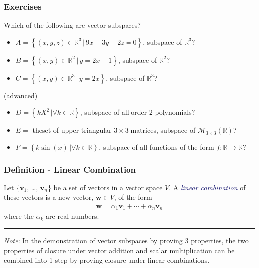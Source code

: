 \documentclass[usenames,dvipsnames,aspectratio=169,10pt]{beamer}
\numberwithin{equation}{section}
\begin{document}
\begin{frame}
\frametitle{Exercises}
Which of the following are vector subspaces?
\begin{itemize}
\item $A= \left\{ (x,y,z)\in\mathbb{R}^3 \, | \, 9x - 3y + 2z = 0 \right\}$, subspace of $\mathbb{R}^3$?
\item $B= \left\{ (x,y)\in\mathbb{R}^2 \, | \, y = 2x + 1 \right\}$, subspace of $\mathbb{R}^2$?
\item $C= \left\{ (x,y)\in\mathbb{R}^3 \, | \, y = 2x \right\}$, subspace of $\mathbb{R}^3$?
\end{itemize}
(advanced)

\begin{itemize}
\item $D= \left\{ k X^2 \, | \forall k\in\mathbb{R} \right\}$, subspace of all order 2 polynomials?
\item $E=$ theset of upper triangular $3\times 3$ matrices, subspace of $\mathcal{M}_{3\times 3}(\mathbb{R})$?
\item $F= \left\{ k \sin(x) \, | \forall k\in\mathbb{R} \right\}$, subspace of all functions of the form $f:\mathbb{R}\to\mathbb{R}$?
\end{itemize}
\end{frame}


\begin{frame}
\frametitle{Definition - Linear Combination}
Let \{$\textbf{v}_1$, \dots, $\textbf{v}_n$\} be a set of vectors in a vector space $V$. A \textcolor{MidnightBlue}{\textit{linear combination}} of these vectors is a new vector, $\textbf{w}\in V$, of the form
\begin{align*}
\textbf{w} = \alpha_1 \textbf{v}_1 + \cdots + \alpha_n \textbf{v}_n
\end{align*}
where the $\alpha_k$ are real numbers.
\vspace{-0.5cm}\begin{center} \textcolor{airforceblue}{\rule{0.7\textwidth}{0.3mm}} \end{center}\vspace{-0.2cm}

\textit{Note}: In the demonstration of vector subspaces by proving 3 properties, the two properties of closure under vector addition and scalar multiplication can be combined into 1 step by proving closure under linear combinations.
\end{frame}
\end{document}
